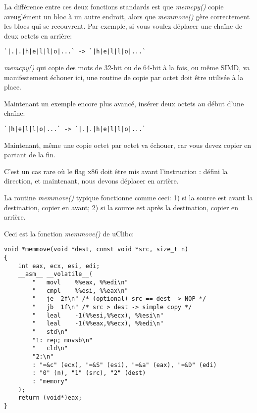 \label{memmove_and_DF}

La différence entre ces deux fonctions standards est que \emph{memcpy()} copie aveuglément
un bloc à un autre endroit, alors que \emph{memmove()} gère correctement les blocs
qui se recouvrent.
Par exemple, si vous voulez déplacer une chaîne de deux octets en arrière:

\begin{lstlisting}
`|.|.|h|e|l|l|o|...` -> `|h|e|l|l|o|...`
\end{lstlisting}

\emph{memcpy()} qui copie des mots de 32-bit ou de 64-bit à la fois, ou même \ac{SIMD},
va manifestement échouer ici, une routine de copie par octet doit être utilisée
à la place.

Maintenant un exemple encore plus avancé, insérer deux octets au début d'une chaîne:

\begin{lstlisting}
`|h|e|l|l|o|...` -> `|.|.|h|e|l|l|o|...`
\end{lstlisting}

Maintenant, même une copie octet par octet va échouer, car vous devez copier en partant
de la fin.

C'est un cas rare où le flag x86  doit être mis avant l'instruction :
 défini la direction, et maintenant, nous devons déplacer en arrière.

La routine \emph{memmove()} typique fonctionne comme ceci:
1) si la source est avant la destination, copier en avant;
2) si la source est après la destination, copier en arrière.

Ceci est la fonction \emph{memmove()} de uClibc:

\begin{lstlisting}[style=customc]
void *memmove(void *dest, const void *src, size_t n)
{
	int eax, ecx, esi, edi;
	__asm__ __volatile__(
		"	movl	%%eax, %%edi\n"
		"	cmpl	%%esi, %%eax\n"
		"	je	2f\n" /* (optional) src == dest -> NOP */
		"	jb	1f\n" /* src > dest -> simple copy */
		"	leal	-1(%%esi,%%ecx), %%esi\n"
		"	leal	-1(%%eax,%%ecx), %%edi\n"
		"	std\n"
		"1:	rep; movsb\n"
		"	cld\n"
		"2:\n"
		: "=&c" (ecx), "=&S" (esi), "=&a" (eax), "=&D" (edi)
		: "0" (n), "1" (src), "2" (dest)
		: "memory"
	);
	return (void*)eax;
}
\end{lstlisting}

